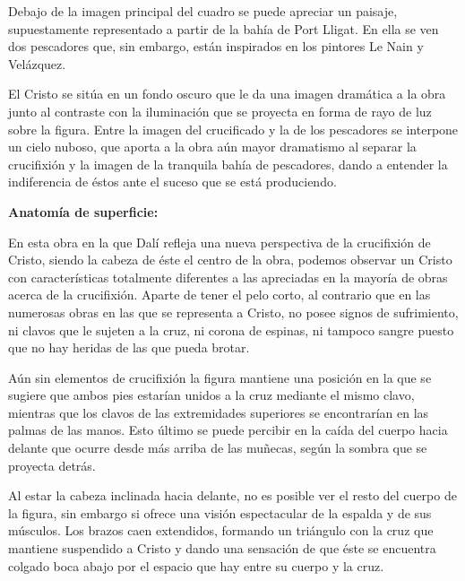 Debajo de la imagen principal del cuadro se puede apreciar un paisaje, supuestamente representado a partir de la bahía de Port Lligat. En ella se ven dos pescadores que, sin embargo, están inspirados en los pintores Le Nain y Velázquez.

El Cristo se sitúa en un fondo oscuro que le da una imagen dramática a la obra junto al contraste con la iluminación que se proyecta en forma de rayo de luz sobre la figura. Entre la imagen del crucificado y la de los pescadores se interpone un cielo nuboso, que aporta a la obra aún mayor dramatismo al separar la crucifixión y la imagen de la tranquila bahía de pescadores, dando a entender la indiferencia de éstos ante el suceso que se está produciendo.


\vspace{12pt}
\textbf{Anatomía de superficie:}

En esta obra en la que Dalí refleja una nueva perspectiva de la crucifixión de Cristo, siendo la cabeza de éste el centro de la obra, podemos observar un Cristo con características totalmente diferentes a las apreciadas en la mayoría de obras acerca de la crucifixión. Aparte de tener el pelo corto, al contrario que en las numerosas obras en las que se representa a Cristo, no posee signos de sufrimiento, ni clavos que le sujeten a la cruz, ni corona de espinas, ni tampoco sangre puesto que no hay heridas de las que pueda brotar.

Aún sin elementos de crucifixión la figura mantiene una posición en la que se sugiere que ambos pies estarían unidos a la cruz mediante el mismo clavo, mientras que los clavos de las extremidades superiores se encontrarían en las palmas de las manos. Esto último se puede percibir en la caída del cuerpo hacia delante que ocurre desde más arriba de las muñecas, según la sombra que se proyecta detrás.

Al estar la cabeza inclinada hacia delante, no es posible ver el resto del cuerpo de la figura, sin embargo si ofrece una visión espectacular de la espalda y de sus músculos. Los brazos caen extendidos, formando un triángulo con la cruz que mantiene suspendido a Cristo y dando una sensación de que éste se encuentra colgado boca abajo por el espacio que hay entre su cuerpo y la cruz.

